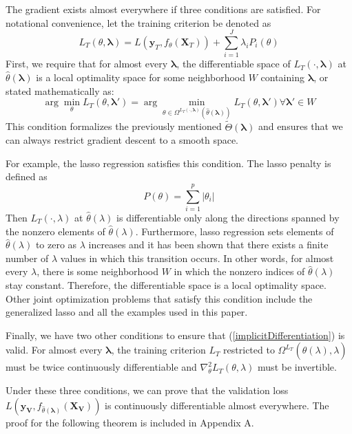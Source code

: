 \documentclass[10pt,letterpaper]{article}
\begin{document}
The gradient exists almost everywhere if three conditions are satisfied. For notational convenience, let the training criterion be denoted as
\begin{equation}
L_T(\theta, \boldsymbol{\lambda}) = L(\boldsymbol{y}_T, f_\theta (\boldsymbol{X}_T)) + \sum\limits_{i=1}^J \lambda_i P_i(\theta)
\end{equation}
First, we require that for almost every $\boldsymbol{\lambda}$, the differentiable space of $L_T(\cdot, \boldsymbol{\lambda})$ at $\hat \theta(\boldsymbol{\lambda})$ is a local optimality space for some neighborhood $W$ containing $\boldsymbol{\lambda}$, or stated mathematically as:
\begin{equation}
\arg \min_\theta L_T(\theta, \boldsymbol{\lambda}') = \arg \min_{\theta \in \Omega^{L_T(\cdot, \boldsymbol{\lambda})}(\hat \theta(\boldsymbol{\lambda}))} L_T(\theta, \boldsymbol{\lambda}') \forall \boldsymbol{\lambda}' \in W
\end{equation}
This condition formalizes the previously mentioned $\tilde \Theta(\boldsymbol{\lambda})$ and ensures that we can always restrict gradient descent to a smooth space.

For example, the lasso regression satisfies this condition. The lasso penalty is defined as
\begin{equation}
P(\theta) = \sum_{i=1}^{p} | \theta_i |
\end{equation}
Then $L_T(\cdot, \lambda)$ at $\hat \theta(\lambda)$ is differentiable only along the directions spanned by the nonzero elements of $\hat \theta(\lambda)$. Furthermore, lasso regression sets elements of $\hat \theta(\lambda)$ to zero as $\lambda$ increases and it has been shown that there exists a finite number of $\lambda$ values in which this transition occurs. In other words, for almost every $\lambda$, there is some neighborhood $W$ in which the nonzero indices of $\hat \theta(\lambda)$ stay constant. Therefore, the differentiable space is a local optimality space. Other joint optimization problems that satisfy this condition include the generalized lasso and all the examples used in this paper.

Finally, we have two other conditions to ensure that (\ref{implicitDifferentiation}) is valid. For almost every $\boldsymbol{\lambda}$, the training criterion $L_T$ restricted to $\Omega^{L_T}(\hat \theta(\lambda), \lambda)$ must be twice continuously differentiable and $\nabla_\theta^2 L_T(\theta, \lambda)$ must be invertible.

Under these three conditions, we can prove that the validation loss $L(\boldsymbol{y_V}, f_{\hat \theta(\boldsymbol{\lambda})}(\boldsymbol{X_V}))$ is continuously differentiable almost everywhere. The proof for the following theorem is included in Appendix A.
\end{document}
